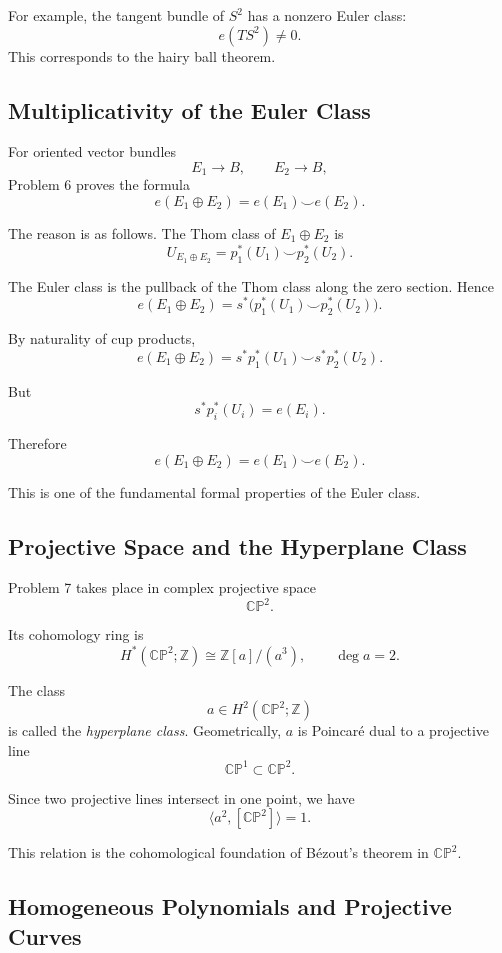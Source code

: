 \documentclass[12pt,a4paper]{article}
\theoremstyle{notespace}
\begin{document}
For example, the tangent bundle of \(S^2\) has a nonzero Euler class:
\[
e(TS^2)\neq 0.
\]
This corresponds to the hairy ball theorem.

\subsection{Multiplicativity of the Euler Class}

For oriented vector bundles
\[
E_1\to B,
\qquad
E_2\to B,
\]
Problem 6 proves the formula
\[
e(E_1\oplus E_2)
=
e(E_1)\smile e(E_2).
\]

The reason is as follows. The Thom class of \(E_1\oplus E_2\) is
\[
U_{E_1\oplus E_2}
=
p_1^*(U_1)\smile p_2^*(U_2).
\]

The Euler class is the pullback of the Thom class along the zero section. Hence
\[
e(E_1\oplus E_2)
=
s^*\bigl(p_1^*(U_1)\smile p_2^*(U_2)\bigr).
\]

By naturality of cup products,
\[
e(E_1\oplus E_2)
=
s^*p_1^*(U_1)\smile s^*p_2^*(U_2).
\]

But
\[
s^*p_i^*(U_i)=e(E_i).
\]

Therefore
\[
e(E_1\oplus E_2)=e(E_1)\smile e(E_2).
\]

This is one of the fundamental formal properties of the Euler class.

\subsection{Projective Space and the Hyperplane Class}

Problem 7 takes place in complex projective space
\[
\mathbb{CP}^2.
\]

Its cohomology ring is
\[
H^*(\mathbb{CP}^2;\mathbb Z)
\cong
\mathbb Z[a]/(a^3),
\qquad
\deg a=2.
\]

The class
\[
a\in H^2(\mathbb{CP}^2;\mathbb Z)
\]
is called the \emph{hyperplane class}. Geometrically, \(a\) is Poincar\'e dual
to a projective line
\[
\mathbb{CP}^1\subset \mathbb{CP}^2.
\]

Since two projective lines intersect in one point, we have
\[
\langle a^2,[\mathbb{CP}^2]\rangle=1.
\]

This relation is the cohomological foundation of B\'ezout's theorem in
\(\mathbb{CP}^2\).

\subsection{Homogeneous Polynomials and Projective Curves}
\end{document}
